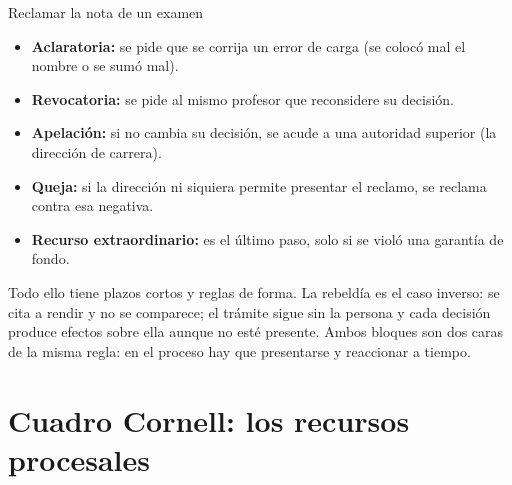 \documentclass[12pt,oneside]{book}
\begin{document}
\begin{example}{Reclamar la nota de un examen}
\begin{itemize}
    \item \textbf{Aclaratoria:} se pide que se corrija un error de carga (se coloc\'o mal el nombre o se sum\'o mal).
    \item \textbf{Revocatoria:} se pide al mismo profesor que reconsidere su decisi\'on.
    \item \textbf{Apelaci\'on:} si no cambia su decisi\'on, se acude a una autoridad superior (la direcci\'on de carrera).
    \item \textbf{Queja:} si la direcci\'on ni siquiera permite presentar el reclamo, se reclama contra esa negativa.
    \item \textbf{Recurso extraordinario:} es el \'ultimo paso, solo si se viol\'o una garant\'ia de fondo.
\end{itemize}
Todo ello tiene plazos cortos y reglas de forma. La rebeld\'ia es el caso inverso: se cita a rendir y no se comparece; el tr\'amite sigue sin la persona y cada decisi\'on produce efectos sobre ella aunque no est\'e presente. Ambos bloques son dos caras de la misma regla: en el proceso hay que presentarse y reaccionar a tiempo.
\end{example}

\section{Cuadro Cornell: los recursos procesales}
\end{document}
